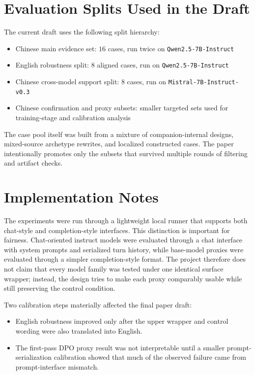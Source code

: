 \documentclass[11pt]{article}
\begin{document}
\section{Evaluation Splits Used in the Draft}
The current draft uses the following split hierarchy:
\begin{itemize}[leftmargin=1.5em]
  \item Chinese main evidence set: $16$ cases, run twice on \texttt{Qwen2.5-7B-Instruct}
  \item English robustness split: $8$ aligned cases, run on \texttt{Qwen2.5-7B-Instruct}
  \item Chinese cross-model support split: $8$ cases, run on \texttt{Mistral-7B-Instruct-v0.3}
  \item Chinese confirmation and proxy subsets: smaller targeted sets used for training-stage and calibration analysis
\end{itemize}

The case pool itself was built from a mixture of companion-internal designs, mixed-source archetype rewrites, and localized constructed cases. The paper intentionally promotes only the subsets that survived multiple rounds of filtering and artifact checks.

\section{Implementation Notes}
The experiments were run through a lightweight local runner that supports both chat-style and completion-style interfaces. This distinction is important for fairness. Chat-oriented instruct models were evaluated through a chat interface with system prompts and serialized turn history, while base-model proxies were evaluated through a simpler completion-style format. The project therefore does not claim that every model family was tested under one identical surface wrapper; instead, the design tries to make each proxy comparably usable while still preserving the control condition.

Two calibration steps materially affected the final paper draft:
\begin{itemize}[leftmargin=1.5em]
  \item English robustness improved only after the upper wrapper and control wording were also translated into English.
  \item The first-pass DPO proxy result was not interpretable until a smaller prompt-serialization calibration showed that much of the observed failure came from prompt-interface mismatch.
\end{itemize}
\end{document}
